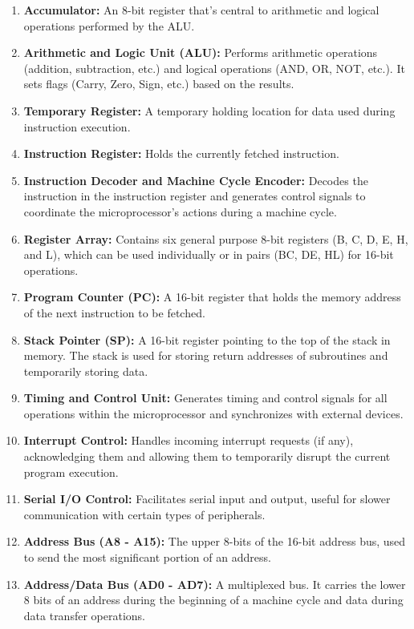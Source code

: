 \documentclass[
]{article}
\begin{document}
\begin{enumerate}
\def\labelenumi{\arabic{enumi}.}
\item
  \textbf{Accumulator:} An 8-bit register that's central to arithmetic
  and logical operations performed by the ALU.
\item
  \textbf{Arithmetic and Logic Unit (ALU):} Performs arithmetic
  operations (addition, subtraction, etc.) and logical operations (AND,
  OR, NOT, etc.). It sets flags (Carry, Zero, Sign, etc.) based on the
  results.
\item
  \textbf{Temporary Register:} A temporary holding location for data
  used during instruction execution.
\item
  \textbf{Instruction Register:} Holds the currently fetched
  instruction.
\item
  \textbf{Instruction Decoder and Machine Cycle Encoder:} Decodes the
  instruction in the instruction register and generates control signals
  to coordinate the microprocessor's actions during a machine cycle.
\item
  \textbf{Register Array:} Contains six general purpose 8-bit registers
  (B, C, D, E, H, and L), which can be used individually or in pairs
  (BC, DE, HL) for 16-bit operations.
\item
  \textbf{Program Counter (PC):} A 16-bit register that holds the memory
  address of the next instruction to be fetched.
\item
  \textbf{Stack Pointer (SP):} A 16-bit register pointing to the top of
  the stack in memory. The stack is used for storing return addresses of
  subroutines and temporarily storing data.
\item
  \textbf{Timing and Control Unit:} Generates timing and control signals
  for all operations within the microprocessor and synchronizes with
  external devices.
\item
  \textbf{Interrupt Control:} Handles incoming interrupt requests (if
  any), acknowledging them and allowing them to temporarily disrupt the
  current program execution.
\item
  \textbf{Serial I/O Control:} Facilitates serial input and output,
  useful for slower communication with certain types of peripherals.
\item
  \textbf{Address Bus (A8 - A15):} The upper 8-bits of the 16-bit
  address bus, used to send the most significant portion of an address.
\item
  \textbf{Address/Data Bus (AD0 - AD7):} A multiplexed bus. It carries
  the lower 8 bits of an address during the beginning of a machine cycle
  and data during data transfer operations.
\end{enumerate}
\end{document}
